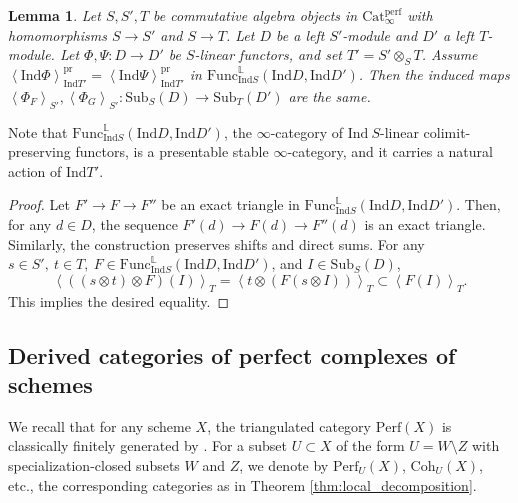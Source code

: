 \documentclass[11pt]{amsart}
\theoremstyle{definition}
\theoremstyle{plain}
\newtheorem{lem}[defn]{Lemma}
\theoremstyle{remark}
\newcommand{\perf}{\mathrm{Perf}}
\newcommand{\coh}{{\mathrm{Coh}}}
\newcommand{\Ind}{\mathrm{Ind}}
\newcommand{\Sub}{\mathrm{Sub}}
\newcommand{\mo}{\mathrm}
\newcommand{\ld}{\mathbb{L}}
\newcommand{\Perf}{\mathrm{Cat}_{\infty}^{\mathrm{perf}}}
\newcommand{\ang}[1]{{\left\langle{#1}\right\rangle}}
\numberwithin{equation}{section}
\begin{document}
\begin{lem}\label{lem:functor_of_thick_subcategories}
Let \(S,S',T\) be commutative algebra objects in \(\Perf\) with homomorphisms \(S\to S'\) and \(S\to T\).
Let \(D\) be a left \(S'\)-module and \(D'\) a left \(T\)-module.
Let \(\Phi,\Psi:D\to D'\) be \(S\)-linear functors, and set \(T'=S'\otimes_S T\).
Assume \(\ang{\Ind \Phi}_{\Ind T'}^{\mo{pr}}=\ang{\Ind \Psi}_{\Ind T'}^{\mo{pr}}\) in \(\mo{Func}_{\Ind S}^{\ld}(\Ind D,\Ind D')\).
Then the induced maps \(\ang{\Phi_F}_{S'},\ang{\Phi_G}_{S'}:\Sub_S(D)\longrightarrow \Sub_T(D')\) are the same.
\end{lem}

\noindent
Note that \(\mo{Func}_{\Ind S}^{\ld}(\Ind D,\Ind D')\), the \(\infty\)-category of \(\Ind~ S\)-linear colimit-preserving functors, is a presentable stable \(\infty\)-category, and it carries a natural action of \(\Ind T'\).


\begin{proof}
Let \(F'\to F\to F''\) be an exact triangle in \(\mo{Func}_{\Ind S}^{\ld}(\Ind D,\Ind D')\).
Then, for any \(d\in D\), the sequence \(F'(d)\to F(d)\to F''(d)\) is an exact triangle.
Similarly, the construction preserves shifts and direct sums.
For any \(s\in S',\ t\in T,\ F\in \mo{Func}_{\Ind S}^{\ld}(\Ind D,\Ind D')\), and \(I\in \Sub_S(D)\), \[\ang{((s\otimes t)\otimes F)(I)}_T=\ang{t\otimes (F(s\otimes I))}_{T}\subset \ang{F(I)}_T.\]
This implies the desired equality. 
\end{proof}


\subsection{Derived categories of perfect complexes of schemes}
We recall that for any scheme \(X\), the triangulated category \(\perf(X)\) is classically finitely generated by \cite[Corollary 3.1.2]{BB}.
For a subset \(U \subset X\) of the form \(U = W \setminus Z\) with specialization-closed subsets \(W\) and \(Z\), we denote by \(\perf_U(X)\), \(\coh_U(X)\), etc., the corresponding categories as in Theorem \ref{thm:local_decomposition}.
\end{document}
